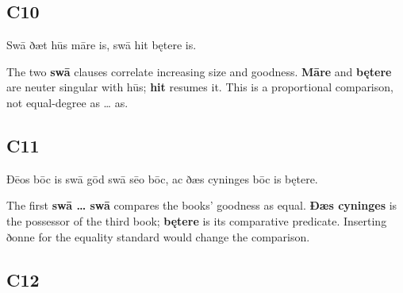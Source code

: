 \subsection*{C10}

\par\begin{minipage}{\linewidth}\raggedright
Swā ðæt hūs māre is, swā hit bętere is.

The two \textbf{swā} clauses correlate increasing size and goodness. \textbf{Māre} and \textbf{bętere} are neuter singular with hūs; \textbf{hit} resumes it. This is a proportional comparison, not equal-degree as … as.

\end{minipage}\par\addvspace{4pt}

\subsection*{C11}

\par\begin{minipage}{\linewidth}\raggedright
Ðēos bōc is swā gōd swā sēo bōc, ac ðæs cyninges bōc is bętere.

The first \textbf{swā … swā} compares the books’ goodness as equal. \textbf{Ðæs cyninges} is the possessor of the third book; \textbf{bętere} is its comparative predicate. Inserting ðonne for the equality standard would change the comparison.

\end{minipage}\par\addvspace{4pt}

\subsection*{C12}

